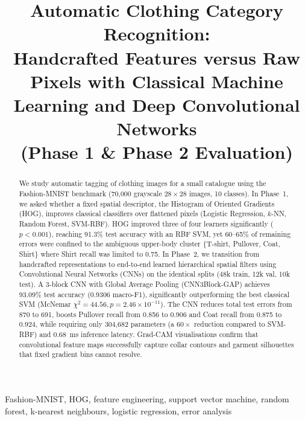 \documentclass[conference]{IEEEtran}
\begin{document}
\title{Automatic Clothing Category Recognition:\\ Handcrafted Features versus Raw Pixels with Classical Machine Learning and Deep Convolutional Networks\\ (Phase 1 \& Phase 2 Evaluation)}

\author{
}

\maketitle

\begin{abstract}
We study automatic tagging of clothing images for a small catalogue using the Fashion-MNIST benchmark (70{,}000 grayscale $28\times28$ images, 10 classes). In Phase~1, we asked whether a fixed spatial descriptor, the Histogram of Oriented Gradients (HOG), improves classical classifiers over flattened pixels (Logistic Regression, $k$-NN, Random Forest, SVM-RBF). HOG improved three of four learners significantly ($p<0.001$), reaching 91.3\% test accuracy with an RBF SVM, yet 60--65\% of remaining errors were confined to the ambiguous upper-body cluster \{T-shirt, Pullover, Coat, Shirt\} where Shirt recall was limited to 0.75. In Phase~2, we transition from handcrafted representations to end-to-end learned hierarchical spatial filters using Convolutional Neural Networks (CNNs) on the identical splits (48k train, 12k val, 10k test). A 3-block CNN with Global Average Pooling (CNN3Block-GAP) achieves 93.09\% test accuracy (0.9306 macro-F1), significantly outperforming the best classical SVM (McNemar $\chi^2 = 44.56, p = 2.46 \times 10^{-11}$). The CNN reduces total test errors from 870 to 691, boosts Pullover recall from 0.856 to 0.906 and Coat recall from 0.875 to 0.924, while requiring only 304{,}682 parameters (a $60\times$ reduction compared to SVM-RBF) and 0.68~ms inference latency. Grad-CAM visualisations confirm that convolutional feature maps successfully capture collar contours and garment silhouettes that fixed gradient bins cannot resolve.
\end{abstract}

\begin{IEEEkeywords}
Fashion-MNIST, HOG, feature engineering, support vector machine, random forest, k-nearest neighbours, logistic regression, error analysis
\end{IEEEkeywords}
\end{document}
